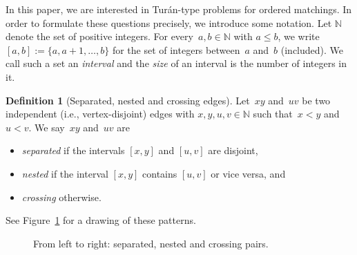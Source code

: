 \documentclass[11pt]{article}
\theoremstyle{definition}
\newtheorem{define}[theorem]{Definition}
\begin{document}
In this paper, we are interested in Tur\'an-type problems for ordered matchings.
In order to formulate these questions precisely, we introduce some notation.
Let $\mathbb N$ denote the set of positive integers.
For every~$a,b\in\mathbb N$ with $a\le b$, we write $[a,b]:=\{a,a+1,\dots,b\}$ for the set of integers between~$a$ and~$b$ (included).
We call such a set an {\it interval} and the {\it size} of an interval is the number of integers in it. 

\begin{define}[Separated, nested and crossing edges]
    Let~$xy$ and~$uv$ be two independent (i.e., vertex-disjoint) edges with $x,y,u,v\in\mathbb N$ such that~$x<y$ and~$u<v$.
    We say~$xy$ and~$uv$ are
    \begin{itemize}
        \item {\it separated} if the intervals $[x,y]$ and $[u,v]$ are disjoint,
        \item {\it nested} if the interval $[x,y]$ contains $[u,v]$ or vice versa, and
       \item {\it crossing} otherwise.
    \end{itemize}
    See Figure~\ref{fig:patterns} for a drawing of these patterns.
\end{define}

\begin{figure}[h!]
\centering
{}
\caption{From left to right: separated, nested and crossing pairs.}
\label{fig:patterns}
\end{figure}
\end{document}
